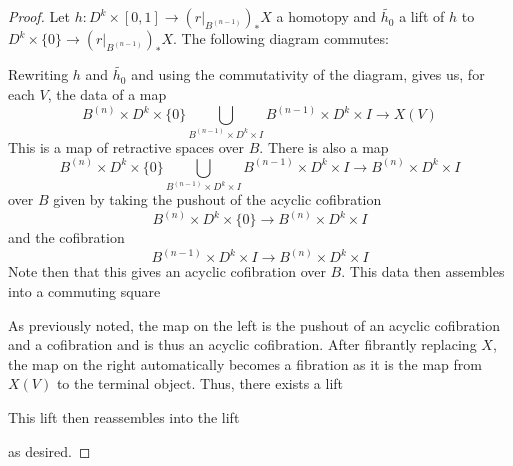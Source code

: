 \documentclass[11pt]{amsart}
\theoremstyle{plain}   %
\theoremstyle{definition}
\theoremstyle{remark}
\numberwithin{equation}{section}
\begin{document}
\begin{proof}

Let $h:D^k\times [0,1]\to (r|_{B^{(n-1)}})_*X$ a homotopy and $\tilde{h_0}$ a lift of $h$ to $D^k\times \{0\} \to (r|_{B^{(n-1)}})_*X$. The following diagram commutes:
\begin{figure}[H]
\center
{}
\end{figure}

Rewriting $h$ and $\tilde{h_0}$ and using the commutativity of the diagram, gives us, for each $V$, the data of a map
\[
B^{(n)}\times D^k\times\{0\}\bigcup_{B^{(n-1)}\times D^k\times I} B^{(n-1)}\times D^k\times I \to X(V)
\]
This is a map of retractive spaces over $B$. There is also a map 
\[
B^{(n)}\times D^k\times\{0\}\bigcup_{B^{(n-1)}\times D^k\times I} B^{(n-1)}\times D^k\times I\to B^{(n)}\times D^k\times I
\]
over $B$ given by taking the pushout of the acyclic cofibration
\[
B^{(n)}\times D^k\times \{0\} \to B^{(n)}\times D^k\times I
\]
and the cofibration 
\[
B^{(n-1)}\times D^k\times I\to B^{(n)}\times D^k\times I
\]
Note then that this gives an acyclic cofibration over $B$. This data then assembles into a commuting square
\begin{figure}[H]
\center
{}
\end{figure}

As previously noted, the map on the left is the pushout of an acyclic cofibration and a cofibration and is thus an acyclic cofibration. After fibrantly replacing $X$, the map on the right automatically becomes a fibration as it is the map from $X(V)$ to the terminal object. Thus, there exists a lift

\begin{figure}[H]
\center
{}
\end{figure}

This lift then reassembles into the lift

\begin{figure}[H]
\center
{}
\end{figure}
as desired.
\end{proof}
\end{document}
